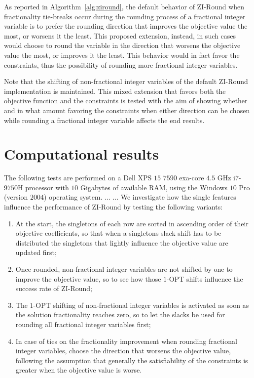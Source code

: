 \documentclass[a4paper,12pt]{book}
\begin{document}
As reported in Algorithm~\ref{alg:ziround}, the default behavior of ZI-Round when fractionality tie-breaks occur during the rounding process of a fractional integer variable is to prefer the rounding direction that improves the objective value the most, or worsens it the least. This proposed extension, instead, in such cases would choose to round the variable in the direction that worsens the objective value the most, or improves it the least. This behavior would in fact favor the constraints, thus the possibility of rounding more fractional integer variables. \par

Note that the shifting of non-fractional integer variables of the default ZI-Round implementation is maintained. This mixed extension that favors both the objective function and the constraints is tested with the aim of showing whether and in what amount favoring the constraints when either direction can be chosen while rounding a fractional integer variable affects the end results.

\chapter{Computational results} \label{ch:compresults}
The following tests are performed on a Dell XPS $15$ $7590$ exa-core $4.5$ GHz i$7$-$9750$H processor with $10$ Gigabytes of available RAM, using the Windows $10$ Pro (version $2004$) operating system.
...
...
We investigate how the single features influence the performance of ZI-Round by testing the following variants:
\begin{enumerate}
	\item At the start, the singletons of each row are sorted in ascending order of their objective coefficients, so that when a singletons slack shift has to be distributed the singletons that lightly influence the objective value are updated first;
	\item Once rounded, non-fractional integer variables are not shifted by one to improve the objective value, so to see how those $1$-OPT shifts influence the success rate of ZI-Round;
	\item The $1$-OPT shifting of non-fractional integer variables is activated as soon as the solution fractionality reaches zero, so to let the slacks be used for rounding all fractional integer variables first;
	\item In case of ties on the fractionality improvement when rounding fractional integer variables, choose the direction that worsens the objective value, following the assumption that generally the satisfiability of the constraints is greater when the objective value is worse.
\end{enumerate}
\end{document}
